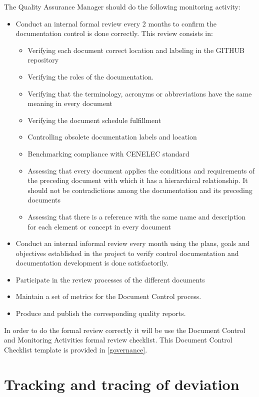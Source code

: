 \documentclass{template/openetcs_article}
\begin{document}
The Quality Assurance Manager should do the following monitoring activity:
\begin{itemize}
\item Conduct an internal formal review every 2 months to confirm the documentation control is done correctly. This review consists in:
\begin{itemize}
\item Verifying each document correct location and labeling in the GITHUB repository
\item Verifying the roles of the documentation.
\item Verifying that the terminology, acronyms or abbreviations have the same meaning in every document
\item Verifying the document schedule fulfillment
\item Controlling obsolete documentation labels and location
\item Benchmarking compliance with CENELEC standard
\item Assessing that every document applies the conditions and requirements of the preceding document with which it has a hierarchical relationship. It should not be contradictions among the documentation and its preceding documents
\item Assessing that there is a reference with the same name and description for each element or concept in every document
\end{itemize}
\item Conduct an internal informal review every month using the plans, goals and objectives established in the project to verify control documentation and documentation development is done satisfactorily.
\item Participate in the review processes of the different documents
\item Maintain a set of metrics for the Document Control process.
\item Produce and publish the corresponding quality reports.
\end{itemize}

In order to do the formal review correctly it will be use the Document Control and Monitoring Activities formal review checklist.  This Document Control Checklist template is provided in \href{https://github.com/openETCS/governance/tree/master/Templates}{[governance]}.

\section{Tracking and tracing of deviation}
\end{document}
